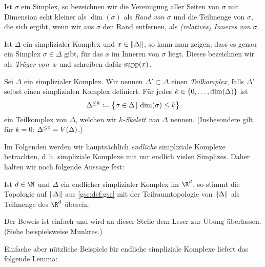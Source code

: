 \begin{thDef}
    Ist $\sigma$ ein Simplex, so bezeichnen wir die Vereinigung aller Seiten von
    $\sigma$ mit Dimension echt kleiner als $\dim(\sigma)$ als \emph{Rand von
    $\sigma$} und die Teilmenge von $\sigma$, die sich ergibt, wenn wir aus
    $\sigma$ den Rand entfernen, als \emph{(relatives) Inneres von $\sigma$}.
\end{thDef}

\begin{thDef}[Träger]
    Ist $\Delta$ ein simplizialer Komplex und $x\in\lVert\Delta\rVert$, so kann man
    zeigen, dass es genau ein Simplex $\sigma\in\Delta$ gibt, für das $x$ im
    Inneren von $\sigma$ liegt. Dieses bezeichnen wir als \emph{Träger von~$x$}
    und schreiben dafür $\operatorname{supp}(x)$.
\end{thDef}

\begin{thDef}
    Sei $\Delta$ ein simplizialer Komplex. Wir nennen $\Delta'\subset\Delta$
    einen \emph{Teilkomplex}, falls $\Delta'$ selbst einen simplizialen Komplex
    definiert.
    Für jedes $k\in\{0,\ldots,\dim(\Delta)\}$ ist
    \[ \skeleton\Delta{k} 
        \defeq \bigl\{ \sigma\in\Delta \Mid \dim(\sigma)\leq k \bigr\}
    \]
    ein Teilkomplex von $\Delta$, welchen wir \emph{$k$-Skelett von $\Delta$}
    nennen. (Insbesondere gilt für $k=0$: $\Delta^{\leq0} = V(\Delta)$.)
\end{thDef}

\medskip
Im Folgenden werden wir hauptsächlich \emph{endliche} simpliziale Komplexe
betrachten, d.\,h. simpliziale Komplexe mit nur endlich vielen Simplizes. Daher
halten wir noch folgende Aussage fest:

\begin{thLemma}
    Ist $d\in\N$ und $\Delta$ ein endlicher simplizialer Komplex im $\R^d$, 
    so stimmt die Topologie auf $\lVert\Delta\rVert$ aus \cref{gsc:def:gsc} mit 
    der Teilraumtopologie von $\lVert\Delta\rVert$ als Teilmenge des $\R^d$
    überein.
\end{thLemma}

Der Beweis ist einfach und wird an dieser Stelle dem Leser zur Übung überlassen.
(Siehe beispielsweise Munkres\cite[Ch.\,1,\;\S2]{bookc:munkres84}.)

Einfache aber nützliche Beispiele für endliche simpliziale Komplexe liefert das
folgende Lemma:

